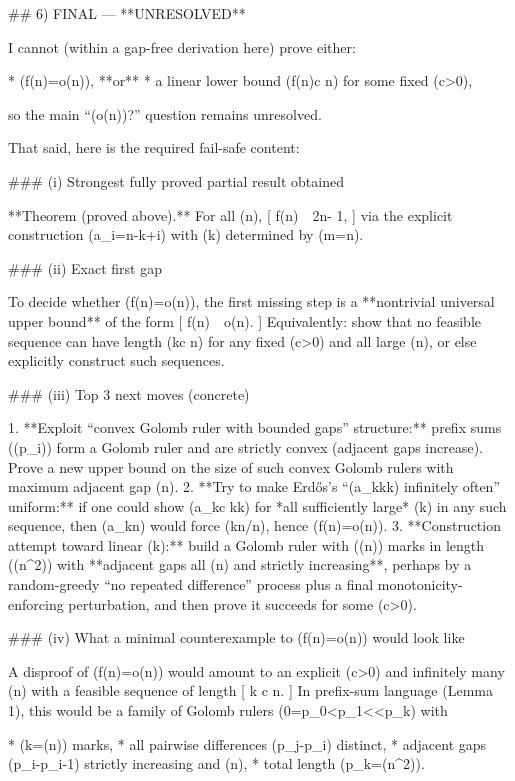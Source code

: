 ## 6) FINAL — **UNRESOLVED**

I cannot (within a gap-free derivation here) prove either:

* (f(n)=o(n)), **or**
* a linear lower bound (f(n)\ge c n) for some fixed (c>0),

so the main “(o(n))?” question remains unresolved.

That said, here is the required fail-safe content:

### (i) Strongest fully proved partial result obtained

**Theorem (proved above).** For all (n),
[
f(n)\ \ge\ 2\lfloor\sqrt n\rfloor - 1,
]
via the explicit construction (a_i=n-k+i) with (k) determined by (m=\lfloor\sqrt n\rfloor).

### (ii) Exact first gap

To decide whether (f(n)=o(n)), the first missing step is a **nontrivial universal upper bound** of the form
[
f(n)\ \le\ o(n).
]
Equivalently: show that no feasible sequence can have length (k\ge c n) for any fixed (c>0) and all large (n), or else explicitly construct such sequences.

### (iii) Top 3 next moves (concrete)

1. **Exploit “convex Golomb ruler with bounded gaps” structure:** prefix sums ((p_i)) form a Golomb ruler and are strictly convex (adjacent gaps increase). Prove a new upper bound on the size of such convex Golomb rulers with maximum adjacent gap (\le n).
2. **Try to make Erdős’s “(a_k\gg k\log k) infinitely often” uniform:** if one could show (a_k\ge c k\log k) for *all sufficiently large* (k) in any such sequence, then (a_k\le n) would force (k\ll n/\log n), hence (f(n)=o(n)).
3. **Construction attempt toward linear (k):** build a Golomb ruler with (\Theta(n)) marks in length (\Theta(n^2)) with **adjacent gaps all (\le n) and strictly increasing**, perhaps by a random-greedy “no repeated difference” process plus a final monotonicity-enforcing perturbation, and then prove it succeeds for some (c>0).

### (iv) What a minimal counterexample to (f(n)=o(n)) would look like

A disproof of (f(n)=o(n)) would amount to an explicit (c>0) and infinitely many (n) with a feasible sequence of length
[
k \ge c n.
]
In prefix-sum language (Lemma 1), this would be a family of Golomb rulers ({0=p_0<p_1<\cdots<p_k}) with

* (k=\Theta(n)) marks,
* all pairwise differences (p_j-p_i) distinct,
* adjacent gaps (p_i-p_{i-1}) strictly increasing and (\le n),
* total length (p_k=\Theta(n^2)).

